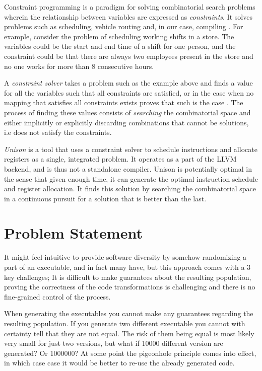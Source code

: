 Constraint programming is a paradigm for solving combinatorial search problems wherein
the relationship between variables are expressed as \textit{constraints}. It solves problems
such as scheduling, vehicle routing and, in our case, compiling
\cite{handbook-constraint-programming, unison-docs}. For example, consider the problem
of scheduling working shifts in a store. The variables could be the start and end time
of a shift for one person, and the constraint could be that there are always two employees
present in the store and no one works for more than 8 consecutive hours.

A \textit{constraint solver} takes a problem such as the example above and finds a value
for all the variables such that all constraints are satisfied, or in the case when no
mapping that satisfies all constraints exists proves that such is the case
\cite{handbook-constraint-programming}. The process of finding these values consists of
\textit{searching} the combinatorial space and either implicitly or explicitly discarding
combinations that cannot be solutions, i.e does not satisfy the constraints.

\textit{Unison} is a tool that uses a constraint solver to schedule instructions and allocate
registers as a single, integrated problem. It operates as a part of the LLVM backend, and
is thus not a standalone compiler. Unison is potentially optimal in the sense that given
enough time, it can generate the optimal instruction schedule and register allocation.
It finds this solution by searching the combinatorial space in a continuous pursuit for a
solution that is better than the last\cite{unison-docs}.

\section{Problem Statement}

It might feel intuitive to provide software diversity by somehow randomizing a part of an
executable, and in fact many have\cite{survey,librando,binary-stirring}, but this
approach comes with a 3 key challenges; It is difficult to make guarantees about the
resulting population, proving the correctness of the code transformations is challenging
and there is no fine-grained control of the process.

When generating the executables you cannot make any guarantees regarding the resulting
population. If you generate two different executable you cannot with certainty tell that
they are not equal. The risk of them being equal is most likely very small for just two
versions, but what if 10000 different version are generated? Or 1000000? At some point the
pigeonhole principle comes into effect, in which case case it would be better to re-use
the already generated code.

